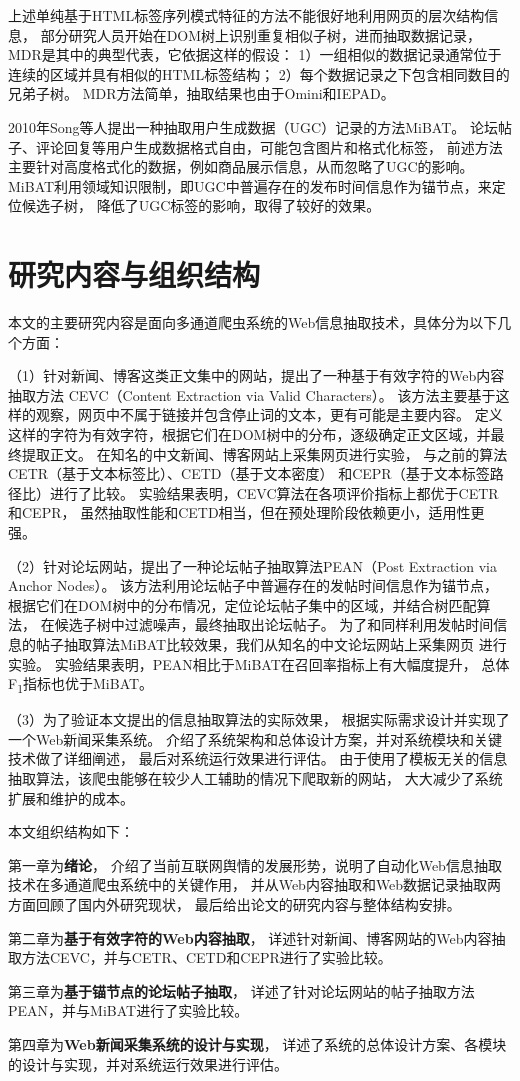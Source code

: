 上述单纯基于HTML标签序列模式特征的方法不能很好地利用网页的层次结构信息，
部分研究人员开始在DOM树上识别重复相似子树，进而抽取数据记录，
MDR是其中的典型代表，它依据这样的假设：
1）一组相似的数据记录通常位于连续的区域并具有相似的HTML标签结构；
2）每个数据记录之下包含相同数目的兄弟子树。
MDR方法简单，抽取结果也由于Omini和IEPAD。

2010年Song等人提出一种抽取用户生成数据（UGC）记录的方法MiBAT。
论坛帖子、评论回复等用户生成数据格式自由，可能包含图片和格式化标签，
前述方法主要针对高度格式化的数据，例如商品展示信息，从而忽略了UGC的影响。
MiBAT利用领域知识限制，即UGC中普遍存在的发布时间信息作为锚节点，来定位候选子树，
降低了UGC标签的影响，取得了较好的效果。

\section{研究内容与组织结构}

本文的主要研究内容是面向多通道爬虫系统的Web信息抽取技术，具体分为以下几个方面：

（1）针对新闻、博客这类正文集中的网站，提出了一种基于有效字符的Web内容抽取方法
CEVC（Content Extraction via Valid Characters）。
该方法主要基于这样的观察，网页中不属于链接并包含停止词的文本，更有可能是主要内容。
定义这样的字符为有效字符，根据它们在DOM树中的分布，逐级确定正文区域，并最终提取正文。
在知名的中文新闻、博客网站上采集网页进行实验，
与之前的算法CETR（基于文本标签比）、CETD（基于文本密度）
和CEPR（基于文本标签路径比）进行了比较。
实验结果表明，CEVC算法在各项评价指标上都优于CETR和CEPR，
虽然抽取性能和CETD相当，但在预处理阶段依赖更小，适用性更强。

（2）针对论坛网站，提出了一种论坛帖子抽取算法PEAN（Post Extraction via Anchor Nodes）。
该方法利用论坛帖子中普遍存在的发帖时间信息作为锚节点，
根据它们在DOM树中的分布情况，定位论坛帖子集中的区域，并结合树匹配算法，
在候选子树中过滤噪声，最终抽取出论坛帖子。
为了和同样利用发帖时间信息的帖子抽取算法MiBAT比较效果，我们从知名的中文论坛网站上采集网页
进行实验。
实验结果表明，PEAN相比于MiBAT在召回率指标上有大幅度提升，
总体F\textsubscript{1}指标也优于MiBAT。

（3）为了验证本文提出的信息抽取算法的实际效果，
根据实际需求设计并实现了一个Web新闻采集系统。
介绍了系统架构和总体设计方案，并对系统模块和关键技术做了详细阐述，
最后对系统运行效果进行评估。
由于使用了模板无关的信息抽取算法，该爬虫能够在较少人工辅助的情况下爬取新的网站，
大大减少了系统扩展和维护的成本。

本文组织结构如下：

第一章为\textbf{绪论}，
介绍了当前互联网舆情的发展形势，说明了自动化Web信息抽取技术在多通道爬虫系统中的关键作用，
并从Web内容抽取和Web数据记录抽取两方面回顾了国内外研究现状，
最后给出论文的研究内容与整体结构安排。

第二章为\textbf{基于有效字符的Web内容抽取}，
详述针对新闻、博客网站的Web内容抽取方法CEVC，并与CETR、CETD和CEPR进行了实验比较。

第三章为\textbf{基于锚节点的论坛帖子抽取}，
详述了针对论坛网站的帖子抽取方法PEAN，并与MiBAT进行了实验比较。

第四章为\textbf{Web新闻采集系统的设计与实现}，
详述了系统的总体设计方案、各模块的设计与实现，并对系统运行效果进行评估。
